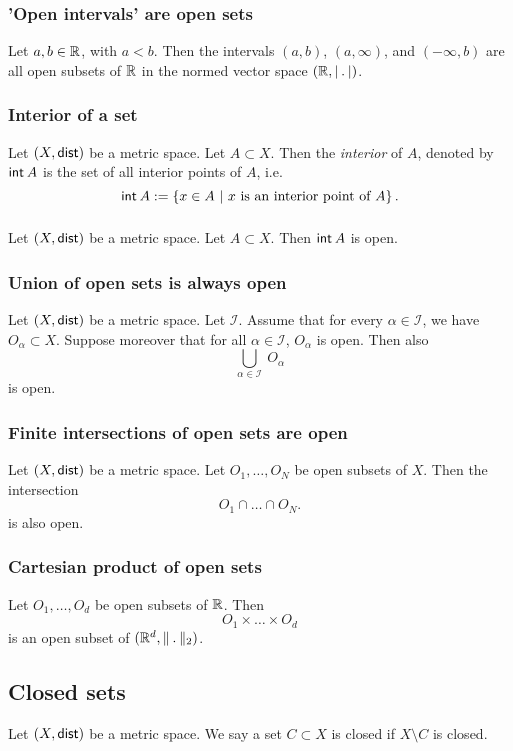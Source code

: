 \subsubsection*{'Open intervals' are open sets}
\uprop Let $a, b \in \mathbb{R}$, with $a < b$. Then the intervals $(a,b)$, $(a, \infty)$, and
$(-\infty, b)$ are all open subsets of $\mathbb{R}$ in the normed vector space
$(\R, \normR)$.

\subsubsection*{Interior of a set}
Let $(X, \mathsf{dist})$ be a metric space. Let $A \subset X$. Then the \emph{interior}
of $A$, denoted by $\setint A$ is the set of all interior points of $A$, i.e.
\[
    \setint A := \left\{ x \in A\ \middle|\ x \text{ is an interior point of } A \right\}.
\]

\subsubsection*{}
\uprop Let $(X, \mathsf{dist})$ be a metric space. Let $A \subset X$. Then $\setint A$
is open.

\subsubsection*{Union of open sets is always open}
\uthm Let $(X, \mathsf{dist})$ be a metric space. Let $\mathcal{I}$.
Assume that for every $\alpha \in \mathcal{I}$, we have $O_\alpha \subset X$.
Suppose moreover that for all $\alpha \in \mathcal{I}$, $O_\alpha$ is open.
Then also
\[
    \bigcup_{\alpha \in \mathcal{I}}\ O_\alpha
\]
is open.

\subsubsection*{Finite intersections of open sets are open}
\uprop Let $(X, \mathsf{dist})$ be a metric space. Let $O_1, \dots, O_N$ be open subsets
of $X$. Then the intersection
\[
    O_1 \cap \dots \cap O_N.
\]
is also open.

\subsubsection*{Cartesian product of open sets}
Let $O_1, \dots, O_d$ be open subsets of $\mathbb{R}$. Then
\[
    O_1 \times \dots \times O_d
\]
is an open subset of $(\R^d, \norm_2)$.

\subsection{Closed sets}
\udef Let $(X, \mathsf{dist})$ be a metric space. We say a set $C \subset X$ is closed 
if $X \setminus C$ is closed.

